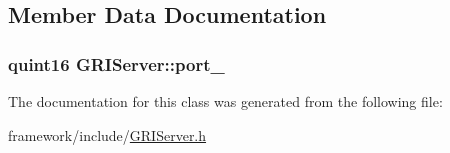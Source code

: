 \subsection{\-Member \-Data \-Documentation}
\hypertarget{classGRIServer_a35403d96a76610c6ac6badc455039643}{
\subsubsection[{port\-\_\-}]{\setlength{\rightskip}{0pt plus 5cm}quint16 {\bf \-G\-R\-I\-Server\-::port\-\_\-}}}\label{classGRIServer_a35403d96a76610c6ac6badc455039643}


\-The documentation for this class was generated from the following file\-:\begin{DoxyCompactItemize}
\item 
framework/include/\hyperlink{GRIServer_8h}{\-G\-R\-I\-Server.\-h}\end{DoxyCompactItemize}
